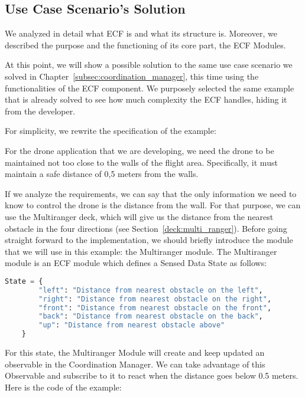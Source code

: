\subsection{Use Case Scenario's Solution}\label{subsec:solution_use_case_scenario}

We analyzed in detail what ECF is and what its structure is. 
Moreover, we described the purpose and the functioning of its core part, the ECF Modules. 

At this point, we will show a possible solution to the same use case scenario we solved in Chapter~\ref{subsec:coordination_manager}, this time using the functionalities of the ECF component.
We purposely selected the same example that is already solved to see how much complexity the ECF handles, hiding it from the developer.

For simplicity, we rewrite the specification of the example:
\begin{displayquote}
    For the drone application that we are developing, we need the drone to be maintained not too close to the walls of the flight area. 
    Specifically, it must maintain a safe distance of 0,5 meters from the walls.
\end{displayquote}

If we analyze the requirements, we can say that the only information we need to know to control the drone is the distance from the wall. 
For that purpose, we can use the Multiranger deck, which will give us the distance from the nearest obstacle in the four directions (see Section~\ref{deck:multi_ranger}).
Before going straight forward to the implementation, we should briefly introduce the module that we will use in this example: the Multiranger module.
The Multiranger module is an ECF module which defines a Sensed Data State as follows:
 
\begin{lstlisting}[language=Python]
    State = {
        "left": "Distance from nearest obstacle on the left",
        "right": "Distance from nearest obstacle on the right",
        "front": "Distance from nearest obstacle on the front",
        "back": "Distance from nearest obstacle on the back",
        "up": "Distance from nearest obstacle above"
    }
\end{lstlisting}

For this state, the Multiranger Module will create and keep updated an observable in the Coordination Manager. 
We can take advantage of this Observable and subscribe to it to react when the distance goes below 0.5 meters.
Here is the code of the example:


